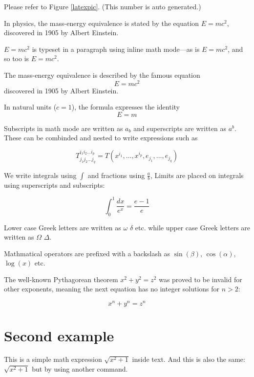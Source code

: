 \documentclass{article}
\begin{document}
Please refer to Figure \ref{latexpic}. (This number is auto generated.)
\blindtext
\blindtext

In physics, the mass-energy equivalence is stated by the equation $E=mc^2$, discovered in 1905 by Albert Einstein.

\begin{math}
E=mc^2
\end{math} is typeset in a paragraph using inline math mode---as is $E=mc^2$, and so too is \(E=mc^2\).

The mass-energy equivalence is described by the famous equation \[ E=mc^2 \] discovered in 1905 by Albert Einstein.

In natural units ($c = 1$), the formula expresses the identity
\begin{equation}
E=m
\end{equation}

Subscripts in math mode are written as $a_b$ and superscripts are written as $a^b$. These can be combinded and nested to write expressions such as

\[ T^{i_1 i_2 \dots i_p}_{j_1 j_2 \dots j_q} =
 T(x^{i_1},\dots,x^{i_p},e_{j_1},\dots,e_{j_q}) \]

 We write integrals using $\int$ and fractions using $\frac{a}{b}$, Limits are placed on integrals using superscripts and subscripts:

 \[ \int_0^1 \frac{dx}{e^x} = \frac{e-1}{e} \]

 Lower case Greek letters are written as $\omega$ $\delta$ etc.
 while upper case Greek letters are written as $\Omega$ $\Delta$.

 Mathmatical operators are prefixed with a backslash as $\sin(\beta)$, $\cos(\alpha)$, $\log(x)$ etc.

 The well-known Pythagorean theorem \(x^2 + y^2 = z^2\) was proved to be invalid for other exponents, meaning the next equation has no integer solutions for \(n>2\):

 \[ x^n + y^n = z^n \]

 \section{Second example}

 This is a simple math expression \(\sqrt{x^2+1}\) inside text.
 And this is also the same:
 \begin{math}
   \sqrt{x^2+1}
 \end{math}
 but by using another command.

   
\end{document}
